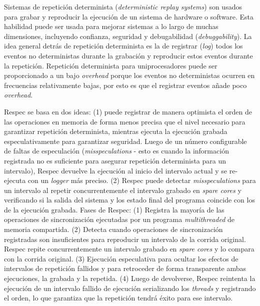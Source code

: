 Sistemas de repetición determinista (\emph{deterministic replay systems}) son usados para grabar y reproducir la ejecución de un sistema de hardware o software. Esta habilidad puede ser usada para mejorar sistemas a lo largo de muchas dimensiones, incluyendo confianza, seguridad y debugabilidad (\emph{debuggability}). La idea general detrás de repetición determinista es la de registrar (\emph{log}) todos los eventos no deterministas durante la grabación y reproducir estos eventos durante la repetición. Repetición determinista para uniprocesadores puede ser proporcionado a un bajo \emph{overhead} porque los eventos no deterministas ocurren en frecuencias relativamente bajas, por esto es que el registrar eventos añade poco \emph{overhead}. 

Respec se basa en dos ideas: (1) puede registrar de manera optimista el orden de las operaciones en memoria de forma menos precisa que el nivel necesario para garantizar repetición determinista, mientras ejecuta la ejecución grabada especulativamente para garantizar seguridad. Luego de un número configurable de faltas de especulación (\emph{misspeculations} - esto es cuando la información registrada no es suficiente para asegurar repetición determinista para un intervalo), Respec devuelve la ejecución al inicio del intervalo actual y se re-ejecuta con un \emph{logger} más preciso. (2) Respec puede detectar \emph{misspeculations} para un intervalo al repetir concurrentemente el intervalo grabado en \emph{spare cores} y verificando si la salida del sistema y los estado final del programa coincide con los de la ejecución grabada. Fases de Respec: (1) Registra la mayoría de las operaciones de sincronización ejecutadas por un programa \emph{multithreaded} de memoria compartida. (2) Detecta cuando operaciones de sincronización registradas son insuficientes para reproducir un intervalo de la corrida original. Respec repite concurrentemente un intervalo grabado en \emph{spare cores} y lo compara con la corrida original. (3) Ejecución especulativa para ocultar los efectos de intervalos de repetición fallidos y para retroceder de forma transparente ambas ejecuciones, la grabada y la repetida. (4) Luego de devolverse, Respec reintenta la ejecución de un intervalo fallido de ejecución serializando los \emph{threads} y registrando el orden, lo que garantiza que la repetición tendrá éxito para ese intervalo.

